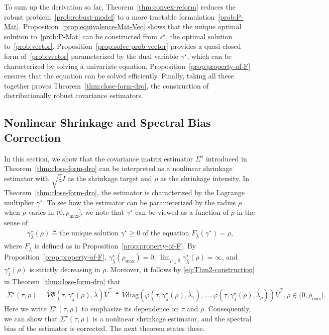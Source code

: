 \documentclass[11pt]{article}
\newcommand{\opt}{^\star}
\newcommand{\Let}{\triangleq}
\def\diag{\mathrm{diag}}
\def\transpose{\top}
\newcommand{\wh}{\widehat}
\begin{document}
To sum up the derivation so far, Theorem~\ref{thm:convex-reform} reduces the robust problem~\eqref{prob:robust-model} to a more tractable formulation~\eqref{prob:P-Mat}. Proposition~\ref{prop:equivalence-Mat-Vec} shows that the unique optimal solution to~\eqref{prob:P-Mat} can be constructed from $s\opt$, the optimal solution to~\eqref{prob:vector}. Proposition~\ref{prop:solve-prob-vector} provides a quasi-closed form of~\eqref{prob:vector} parameterized by the dual variable $\gamma\opt$, which can be characterized by solving a univariate equation. Proposition~\ref{prop:property-of-F} ensures that the equation can be solved efficiently. Finally, taking all these together proves Theorem~\ref{thm:close-form-dro}, the construction of distributionally robust covariance estimators.



\subsection{Nonlinear Shrinkage and Spectral Bias Correction}\label{sec:nonlinear-shrink}

In this section, we show that the covariance matrix estimator $\Sigma\opt$ introduced in Theorem~\ref{thm:close-form-dro} can be interpreted as a nonlinear shrinkage estimator with $\sqrt{\frac{1}{\tau}}I$ as the shrinkage target and $\rho$ as the shrinkage intensity. In Theorem~\ref{thm:close-form-dro}, the estimator is characterized by the Lagrange multiplier $\gamma\opt$. To see how the estimator can be parameterized by the radius $\rho$ when $\rho$ varies in $(0, \rho_{\max}]$, we note that $\gamma\opt$ can be viewed as a function of $\rho$ in the sense of 
\begin{align}\label{def-gamma-opt}
    \gamma_{\wh\lambda}\opt(\rho) \Let \text{the unique solution $\gamma\opt\geq 0$ of the equation } F_{\wh\lambda}(\gamma\opt) = \rho,
\end{align}
where $F_{\wh\lambda}$ is defined as in Proposition~\ref{prop:property-of-F}. By Proposition~\ref{prop:property-of-F}, $\gamma_{\wh\lambda}\opt(\rho_{\max}) = 0$, $\lim_{\rho\downarrow 0}\gamma_{\wh\lambda}\opt(\rho) = \infty$, and $\gamma_{\wh\lambda}\opt(\rho)$ is  strictly decreasing in $\rho$.
Moreover, it follows by \eqref{eq:Thm2-construction} in Theorem~\ref{thm:close-form-dro} that
\begin{align}\label{eq:construct-Sigma-opt}
    \Sigma\opt(\tau,  \rho)=\widehat{V}\Phi(\tau, \gamma_{\wh\lambda}\opt( \rho), \widehat{\lambda})\widehat{V}^\transpose\Let\wh V \diag(\varphi(\tau, \gamma_{\wh\lambda}\opt( \rho), \widehat{\lambda}_1), \ldots ,\varphi(\tau, \gamma_{\wh\lambda}\opt( \rho), \widehat{\lambda}_p))\wh V^\transpose,  \rho\in (0,  \rho_{\max}].
\end{align}
Here we write $\Sigma\opt(\tau,\rho)$ to emphasize its dependence on $\tau$ and $\rho$. Consequently, we can show that $\Sigma\opt(\tau,  \rho)$ is a nonlinear shrinkage estimator, and the spectral bias of the estimator is corrected. The next theorem states these.
\end{document}

